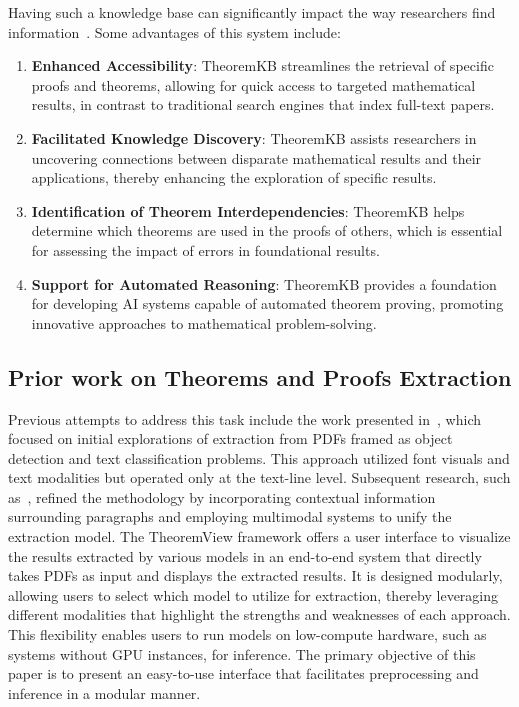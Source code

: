 \documentclass[runningheads]{llncs}
\begin{document}
Having such a knowledge base can significantly impact the way researchers
find information~\cite{mishra2021towards}. Some advantages of this system include:
\begin{enumerate}
	\item \textbf{Enhanced Accessibility}: TheoremKB streamlines the retrieval of specific proofs and theorems, allowing for quick access to targeted mathematical results, in contrast to traditional search engines that index full-text papers.
	\item \textbf{Facilitated Knowledge Discovery}: TheoremKB assists researchers in uncovering connections between disparate mathematical results and their applications, thereby enhancing the exploration of specific results.
	\item \textbf{Identification of Theorem Interdependencies}: TheoremKB helps determine which theorems are used in the proofs of others, which is essential for assessing the impact of errors in foundational results.
	\item \textbf{Support for Automated Reasoning}: TheoremKB provides a foundation for developing AI systems capable of automated theorem proving, promoting innovative approaches to mathematical problem-solving.
\end{enumerate}

\subsection{Prior work on Theorems and Proofs Extraction}

Previous attempts to address this task include the work presented in~\cite{mishra2021towards}, which focused on
initial explorations of extraction from PDFs framed as object detection and text classification problems.
This approach utilized font visuals and text modalities but operated only at the text-line level. Subsequent
research, such as~\cite{mishra2024multimodal}, refined the methodology by incorporating contextual information
surrounding paragraphs and employing multimodal systems to unify the extraction model.
The TheoremView framework offers a user interface to visualize the results extracted by various models in
an end-to-end system that directly takes PDFs as input and displays the extracted results. It is designed
modularly, allowing users to select which model to utilize for extraction, thereby leveraging different
modalities that highlight the strengths and weaknesses of each approach. This flexibility enables users
to run models on low-compute hardware, such as systems without GPU instances, for inference. The primary
objective of this paper is to present an easy-to-use interface that facilitates preprocessing and inference
in a modular manner.
\end{document}
